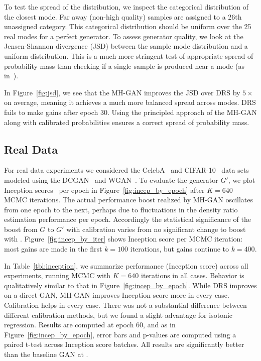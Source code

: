 \documentclass{article}
\begin{document}
To test the spread of the distribution, we inspect the categorical distribution of the closest mode.
Far away (non-high quality) samples are assigned to a 26th unassigned category.
This categorical distribution should be uniform over the 25 real modes for a perfect generator.
To assess generator quality, we look at the Jensen-Shannon divergence (JSD) between the sample mode distribution and a uniform distribution.
This is a much more stringent test of appropriate spread of probability mass than checking if a single sample is produced near a mode (as in~\citet{Azadi2018})\@.




In Figure~\ref{fig:jsd}, we see that the MH-GAN improves the JSD over DRS by $5 \times$ on average, meaning it achieves a much more balanced spread across modes.
DRS fails to make gains after epoch 30.
Using the principled approach of the MH-GAN along with calibrated probabilities ensures a correct spread of probability mass.

\subsection{Real Data}

For real data experiments we considered the CelebA~\citep{Liu2015} and CIFAR-10~\citep{Torralba2008} data sets modeled using the DCGAN~\citep{Radford2015} and WGAN~\citep{Arjovsky2017, Gulrajani2017}.
To evaluate the generator $G'$, we plot Inception scores~\citep{Salimans2016} per epoch in Figure~\ref{fig:incep_by_epoch} after $K=640$ MCMC iterations.
The actual performance boost realized by MH-GAN oscillates from one epoch to the next, perhaps due to fluctuations in the density ratio estimation performance per epoch.
Accordingly the statistical significance of the boost from $G$ to $G'$ with calibration varies from no significant change to boost with .
Figure~\ref{fig:incep_by_iter} shows Inception score per MCMC iteration:
most gains are made in the first $k=100$ iterations, but gains continue to $k=400$.




In Table~\ref{tbl:inception}, we summarize performance (Inception score) across all experiments, running MCMC with $K=640$ iterations in all cases.
Behavior is qualitatively similar to that in Figure~\ref{fig:incep_by_epoch}.
While DRS improves on a direct GAN, MH-GAN improves Inception score more in every case.
Calibration helps in every case.
There was not a substantial difference between different calibration methods, but we found a slight advantage for isotonic regression.
Results are computed at epoch 60, and as in Figure~\ref{fig:incep_by_epoch}, error bars and p-values are computed using a paired t-test across Inception score batches.
All results are significantly better than the baseline GAN at .
\end{document}
